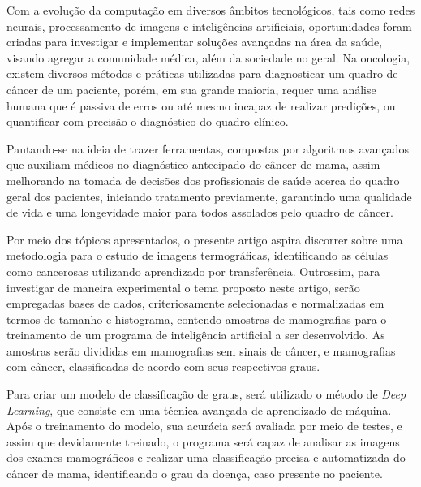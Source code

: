 Com a evolução da computação em diversos âmbitos tecnológicos, tais como redes neurais, processamento de imagens e inteligências artificiais, oportunidades foram criadas para investigar e implementar soluções avançadas na área da saúde, visando agregar a comunidade médica, além da sociedade no geral. Na oncologia, existem diversos métodos e práticas utilizadas para diagnosticar um quadro de câncer de um paciente, porém, em sua grande maioria, requer uma análise humana que é passiva de erros ou até mesmo incapaz de realizar predições, ou quantificar com precisão o diagnóstico do quadro clínico.

Pautando-se na ideia de trazer ferramentas, compostas por algoritmos avançados que auxiliam médicos no diagnóstico antecipado do câncer de mama, assim melhorando na tomada de decisões dos profissionais de saúde acerca do quadro geral dos pacientes, iniciando tratamento previamente, garantindo uma qualidade de vida e uma longevidade maior para todos assolados pelo quadro de câncer.

Por meio dos tópicos apresentados, o presente artigo aspira discorrer sobre uma metodologia para o estudo de imagens termográficas, identificando as células como cancerosas utilizando aprendizado por transferência. Outrossim, para investigar de maneira experimental o tema proposto neste artigo, serão empregadas bases de dados, criteriosamente selecionadas e normalizadas em termos de tamanho e histograma, contendo amostras de mamografias para o treinamento de um programa de inteligência artificial a ser desenvolvido. As amostras serão divididas em mamografias sem sinais de câncer, e mamografias com câncer, classificadas de acordo com seus respectivos graus.

Para criar um modelo de classificação de graus, será utilizado o método de \textit{Deep Learning}, que consiste em uma técnica avançada de aprendizado de máquina. Após o treinamento do modelo, sua acurácia será avaliada por meio de testes, e assim que devidamente treinado, o programa será capaz de analisar as imagens dos exames mamográficos e realizar uma classificação precisa e automatizada do câncer de mama, identificando o grau da doença, caso presente no paciente.






